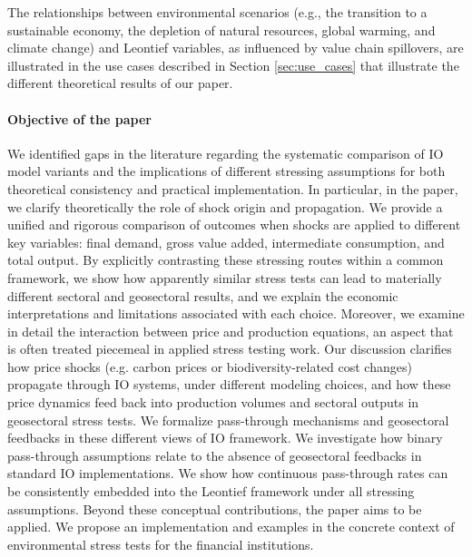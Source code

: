 \documentclass{article}
\begin{document}
\vspace{0.1cm}

The relationships between environmental scenarios (e.g., the transition to a sustainable economy, the depletion of natural resources, global warming, and climate change) and Leontief variables, as influenced by value chain spillovers, are illustrated in the use cases described in Section \ref{sec:use_cases} that illustrate the different theoretical results of our paper. 

\paragraph{Objective of the paper} We identified gaps in the literature regarding the systematic comparison of IO model variants and the implications of different stressing assumptions for both theoretical consistency and practical implementation. 
In particular, in the paper, we clarify theoretically the role of shock origin and propagation. We provide a unified and rigorous comparison of outcomes when shocks are applied to different key variables: final demand, gross value added, intermediate consumption, and total output. By explicitly contrasting these stressing routes within a common framework, we show how apparently similar stress tests can lead to materially different sectoral and geosectoral results, and we explain the economic interpretations and limitations associated with each choice. 
Moreover, we examine in detail the interaction between price and production equations, an aspect that is often treated piecemeal in applied stress testing work. Our discussion clarifies how price shocks (e.g. carbon prices or biodiversity-related cost changes) propagate through IO systems, under different modeling choices, and how these price dynamics feed back into production volumes and sectoral outputs in geosectoral stress tests.
We formalize pass-through mechanisms and geosectoral feedbacks in these different views of IO framework. We investigate how binary pass-through assumptions relate to the absence of geosectoral feedbacks in standard IO implementations. We show how continuous pass-through rates can be consistently embedded into the Leontief framework under all stressing assumptions. 
Beyond these conceptual contributions, the paper aims to be applied. We propose an implementation and examples in the concrete context of environmental stress tests for the financial institutions. 
\end{document}

